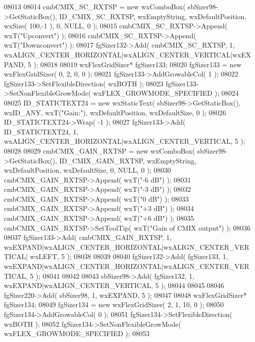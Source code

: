 \begin{DoxyCode}
08013     
08014     cmbCMIX_SC_RXTSP = \textcolor{keyword}{new} wxComboBox( sbSizer98->GetStaticBox(), 
      ID_CMIX_SC_RXTSP, wxEmptyString, wxDefaultPosition, wxSize( 100,-1 ), 0, NULL, 0 );
08015     cmbCMIX_SC_RXTSP->Append( wxT(\textcolor{stringliteral}{"Upconvert"}) );
08016     cmbCMIX_SC_RXTSP->Append( wxT(\textcolor{stringliteral}{"Downconvert"}) );
08017     fgSizer132->Add( cmbCMIX_SC_RXTSP, 1, wxALIGN\_CENTER\_HORIZONTAL|wxALIGN\_CENTER\_VERTICAL|wxEXPAND, 5 );
08018     
08019     wxFlexGridSizer* fgSizer133;
08020     fgSizer133 = \textcolor{keyword}{new} wxFlexGridSizer( 0, 2, 0, 0 );
08021     fgSizer133->AddGrowableCol( 1 );
08022     fgSizer133->SetFlexibleDirection( wxBOTH );
08023     fgSizer133->SetNonFlexibleGrowMode( wxFLEX\_GROWMODE\_SPECIFIED );
08024     
08025     ID_STATICTEXT24 = \textcolor{keyword}{new} wxStaticText( sbSizer98->GetStaticBox(), wxID\_ANY, wxT(\textcolor{stringliteral}{"Gain:"}), 
      wxDefaultPosition, wxDefaultSize, 0 );
08026     ID_STATICTEXT24->Wrap( -1 );
08027     fgSizer133->Add( ID_STATICTEXT24, 1, wxALIGN\_CENTER\_HORIZONTAL|wxALIGN\_CENTER\_VERTICAL, 5 );
08028     
08029     cmbCMIX_GAIN_RXTSP = \textcolor{keyword}{new} wxComboBox( sbSizer98->GetStaticBox(), 
      ID_CMIX_GAIN_RXTSP, wxEmptyString, wxDefaultPosition, wxDefaultSize, 0, NULL, 0 );
08030     cmbCMIX_GAIN_RXTSP->Append( wxT(\textcolor{stringliteral}{"-6 dB"}) );
08031     cmbCMIX_GAIN_RXTSP->Append( wxT(\textcolor{stringliteral}{"-3 dB"}) );
08032     cmbCMIX_GAIN_RXTSP->Append( wxT(\textcolor{stringliteral}{"0 dB"}) );
08033     cmbCMIX_GAIN_RXTSP->Append( wxT(\textcolor{stringliteral}{"+3 dB"}) );
08034     cmbCMIX_GAIN_RXTSP->Append( wxT(\textcolor{stringliteral}{"+6 dB"}) );
08035     cmbCMIX_GAIN_RXTSP->SetToolTip( wxT(\textcolor{stringliteral}{"Gain of CMIX output"}) );
08036     
08037     fgSizer133->Add( cmbCMIX_GAIN_RXTSP, 1, wxEXPAND|wxALIGN\_CENTER\_HORIZONTAL|wxALIGN\_CENTER\_VERTICAL|
      wxLEFT, 5 );
08038     
08039     
08040     fgSizer132->Add( fgSizer133, 1, wxEXPAND|wxALIGN\_CENTER\_HORIZONTAL|wxALIGN\_CENTER\_VERTICAL, 5 );
08041     
08042     
08043     sbSizer98->Add( fgSizer132, 1, wxEXPAND|wxALIGN\_CENTER\_VERTICAL, 5 );
08044     
08045     
08046     fgSizer220->Add( sbSizer98, 1, wxEXPAND, 5 );
08047     
08048     wxFlexGridSizer* fgSizer134;
08049     fgSizer134 = \textcolor{keyword}{new} wxFlexGridSizer( 2, 1, 10, 0 );
08050     fgSizer134->AddGrowableCol( 0 );
08051     fgSizer134->SetFlexibleDirection( wxBOTH );
08052     fgSizer134->SetNonFlexibleGrowMode( wxFLEX\_GROWMODE\_SPECIFIED );
08053     

\end{DoxyCode}
